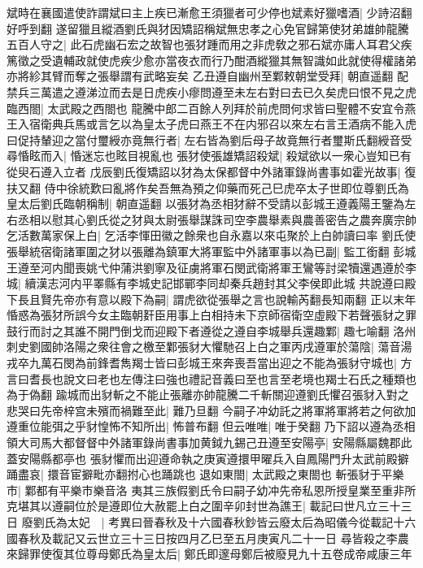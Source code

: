 斌時在襄國遣使詐謂斌曰主上疾已漸愈王須獵者可少停也斌素好獵嗜酒|{
	少詩沼翻好呼到翻}
遂留獵且縱酒劉氏與犲因矯詔稱斌無忠孝之心免官歸第使犲弟雄帥龍騰五百人守之|{
	此石虎幽石宏之故智也張犲踵而用之非虎敎之邪石斌亦庸人耳君父疾篤徵之受遺輔政就使虎疾少愈亦當夜衣而行乃酣酒縱獵其無智識如此就使得權諸弟亦將紾其臂而奪之張舉謂有武略妄矣}
乙丑遵自幽州至鄴敕朝堂受拜|{
	朝直遥翻}
配禁兵三萬遣之遵涕泣而去是日虎疾小瘳問遵至未左右對曰去已久矣虎曰恨不見之虎臨西閤|{
	太武殿之西閤也}
龍騰中郎二百餘人列拜於前虎問何求皆曰聖體不安宜令燕王入宿衛典兵馬或言乞以為皇太子虎曰燕王不在内邪召以來左右言王酒病不能入虎曰促持輦迎之當付璽綬亦竟無行者|{
	左右皆為劉后母子故竟無行者璽斯氏翻綬音受}
尋惛眩而入|{
	惛迷忘也眩目視亂也}
張犲使張雄矯詔殺斌|{
	殺斌欲以一衆心豈知已有從臾石遵入立者}
戊辰劉氏復矯詔以犲為太保都督中外諸軍錄尚書事如霍光故事|{
	復扶又翻}
侍中徐統歎曰亂將作矣吾無為預之仰藥而死己巳虎卒太子世即位尊劉氏為皇太后劉氏臨朝稱制|{
	朝直遥翻}
以張犲為丞相犲辭不受請以彭城王遵義陽王鑒為左右丞相以慰其心劉氏從之犲與太尉張舉謀誅司空李農舉素與農善密告之農奔廣宗帥乞活數萬家保上白|{
	乞活李惲田徽之餘衆也自永嘉以來屯聚於上白帥讀曰率}
劉氏使張舉統宿衛諸軍圍之犲以張離為鎮軍大將軍監中外諸軍事以為已副|{
	監工銜翻}
彭城王遵至河内聞喪姚弋仲蒲洪劉寧及征虜將軍石閔武衛將軍王鸞等討梁犢還遇遵於李城|{
	續漢志河内平睪縣有李城史記邯鄲李同却秦兵趙封其父李侯即此城}
共說遵曰殿下長且賢先帝亦有意以殿下為嗣|{
	謂虎欲從張舉之言也說輸芮翻長知兩翻}
正以末年惛惑為張犲所誤今女主臨朝姧臣用事上白相持未下京師宿衛空虛殿下若聲張豺之罪鼓行而討之其誰不開門倒戈而迎殿下者遵從之遵自李城舉兵還趣鄴|{
	趣七喻翻}
洛州刺史劉國帥洛陽之衆往會之檄至鄴張豺大懼馳召上白之軍丙戌遵軍於蕩陰|{
	蕩音湯}
戎卒九萬石閔為前鋒耆雋羯士皆曰彭城王來奔喪吾當出迎之不能為張豺守城也|{
	方言曰耆長也說文曰老也左傳注曰強也禮記音義曰至也言至老境也羯士石氏之種類也為于偽翻}
踰城而出豺斬之不能止張離亦帥龍騰二千斬關迎遵劉氏懼召張豺入對之悲哭曰先帝梓宫未殯而禍難至此|{
	難乃旦翻}
今嗣子冲幼託之將軍將軍將若之何欲加遵重位能弭之乎豺惶怖不知所出|{
	怖普布翻}
但云唯唯|{
	唯于癸翻}
乃下詔以遵為丞相領大司馬大都督督中外諸軍錄尚書事加黄鉞九錫己丑遵至安陽亭|{
	安陽縣屬魏郡此蓋安陽縣都亭也}
張豺懼而出迎遵命執之庚寅遵擐甲曜兵入自鳳陽門升太武前殿擗踊盡哀|{
	擐音宦擗毗亦翻拊心也踊跳也}
退如東閤|{
	太武殿之東閤也}
斬張豺于平樂市|{
	鄴都有平樂市樂音洛}
夷其三族假劉氏令曰嗣子幼冲先帝私恩所授皇業至重非所克堪其以遵嗣位於是遵即位大赦罷上白之圍辛卯封世為譙王|{
	載記曰世凡立三十三日}
廢劉氏為太妃　|{
	考異曰晉春秋及十六國春秋鈔皆云廢太后為昭儀今從載記十六國春秋及載記又云世立三十三日按四月乙巳至五月庚寅凡二十一日}
尋皆殺之李農來歸罪使復其位尊母鄭氏為皇太后|{
	鄭氏即邃母鄭后被廢見九十五卷成帝咸康三年}
